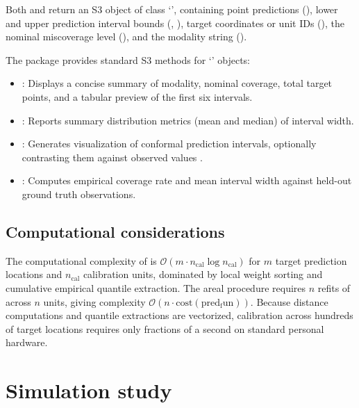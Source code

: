 \documentclass[article]{jss}
\newcommand{\class}[1]{`\code{#1}'}
\begin{document}
Both  and  return an S3 object of class \class{spconform}, containing point predictions (), lower and upper prediction interval bounds (, ), target coordinates or unit IDs (), the nominal miscoverage level (), and the modality string (). 

The package provides standard S3 methods for \class{spconform} objects:
%
\begin{itemize}
\item {}: Displays a concise summary of modality, nominal coverage, total target points, and a tabular preview of the first six intervals.
\item {}: Reports summary distribution metrics (mean and median) of interval width.
\item {}: Generates visualization of conformal prediction intervals, optionally contrasting them against observed values .
\item {}: Computes empirical coverage rate and mean interval width against held-out ground truth observations.
\end{itemize}

\subsection{Computational considerations}

The computational complexity of  is $\mathcal{O}(m \cdot n_{\mathrm{cal}} \log n_{\mathrm{cal}})$ for $m$ target prediction locations and $n_{\mathrm{cal}}$ calibration units, dominated by local weight sorting and cumulative empirical quantile extraction. The areal procedure requires $n$ refits of  across $n$ units, giving complexity $\mathcal{O}(n \cdot \mathrm{cost}(\mathrm{pred_fun}))$. Because distance computations and quantile extractions are vectorized, calibration across hundreds of target locations requires only fractions of a second on standard personal hardware.


\section{Simulation study}\label{sec:simulation}
\end{document}

